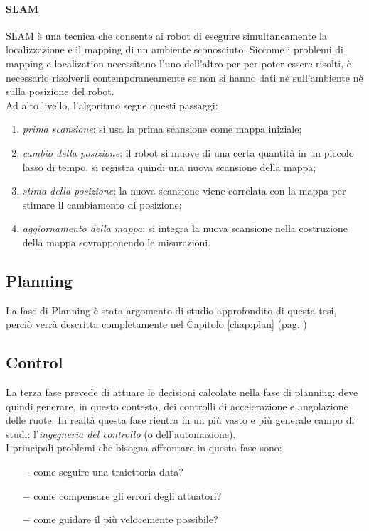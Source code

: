 \paragraph{SLAM}
\label{par:slam}
SLAM è una tecnica che consente ai robot di eseguire simultaneamente la localizzazione e il mapping
di un ambiente sconosciuto. Siccome i problemi di mapping e localization necessitano l'uno dell'altro
per per poter essere risolti, è necessario risolverli contemporaneamente se non si hanno dati
nè sull'ambiente nè sulla posizione del robot.\\
Ad alto livello, l'algoritmo segue questi passaggi:
\begin{enumerate}
	\item \textit{prima scansione}: si usa la prima scansione come mappa iniziale;
	\item \textit{cambio della posizione}: il robot si muove di una certa quantità in un piccolo
	      lasso di tempo, si registra quindi una nuova scansione della mappa;
	\item \textit{stima della posizione}: la nuova scansione viene correlata con la mappa per
	      stimare il cambiamento di posizione;
	\item \textit{aggiornamento della mappa}: si integra la nuova scansione nella costruzione della mappa
	      sovrapponendo le misurazioni.
\end{enumerate}

\subsection{Planning}
La fase di Planning è stata argomento di studio approfondito di questa tesi, perciò verrà descritta
completamente nel Capitolo \ref{chap:plan} (pag. \pageref{chap:plan})

\subsection{Control}
La terza fase prevede di attuare le decisioni calcolate nella fase di planning: deve quindi generare, in
questo contesto, dei controlli di accelerazione e angolazione delle ruote. In realtà questa fase rientra
in un più vasto e più generale campo di studi: l'\textit{ingegneria del controllo} (o dell'automazione).\\
I principali problemi che bisogna affrontare in questa fase sono:
\begin{itemize}
	\setlength\itemsep{0em}
	\item[$-$] come seguire una traiettoria data?
	\item[$-$] come compensare gli errori degli attuatori?
	\item[$-$] come guidare il più velocemente possibile?
\end{itemize}

